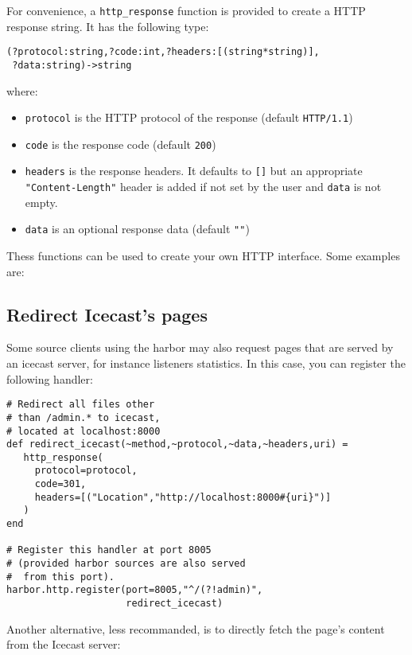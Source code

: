 For convenience, a \verb+http_response+ function is provided to 
create a HTTP response string. It has the following type:

\begin{verbatim}
(?protocol:string,?code:int,?headers:[(string*string)],
 ?data:string)->string
\end{verbatim}
where:

\begin{itemize}
\item \verb+protocol+ is the HTTP protocol of the response (default \verb+HTTP/1.1+)
\item \verb+code+ is the response code (default \verb+200+)
\item \verb+headers+ is the response headers. It defaults to \verb+[]+ but an appropriate \verb+"Content-Length"+ header is added if not set by the user and \verb+data+ is not empty.
\item \verb+data+ is an optional response data (default \verb+""+)

\end{itemize}
Thess functions can be used to create your own HTTP interface. Some examples
are:

\subsection{Redirect Icecast's pages}
Some source clients using the harbor may also request pages that
are served by an icecast server, for instance listeners statistics.
In this case, you can register the following handler:

\begin{verbatim}
# Redirect all files other
# than /admin.* to icecast,
# located at localhost:8000
def redirect_icecast(~method,~protocol,~data,~headers,uri) =
   http_response(
     protocol=protocol,
     code=301,
     headers=[("Location","http://localhost:8000#{uri}")]
   )
end

# Register this handler at port 8005
# (provided harbor sources are also served
#  from this port).
harbor.http.register(port=8005,"^/(?!admin)",
                     redirect_icecast)
\end{verbatim}
Another alternative, less recommanded, is to
directly fetch the page's content from the Icecast server:

